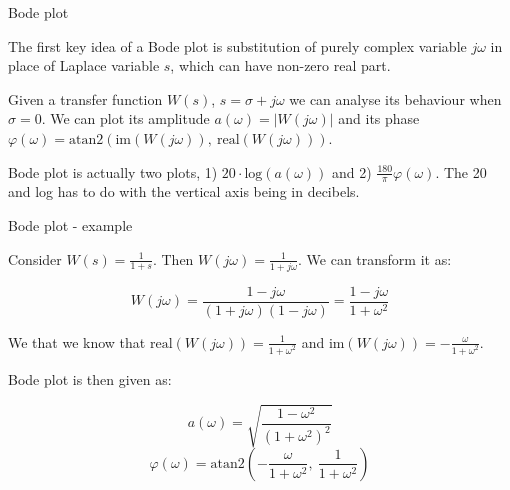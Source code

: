 \documentclass{beamer}
\begin{document}
\begin{frame}{Bode plot}
\begin{flushleft}

The first key idea of a Bode plot is substitution of purely complex variable $j \omega$ in place of Laplace variable $s$, which can have non-zero real part.

\bigskip

Given a transfer function $W(s)$, $s = \sigma + j \omega$ we can analyse its behaviour when $\sigma = 0$. We can plot its amplitude $a(\omega) = \left| W(j \omega) \right|$ and its phase $\varphi(\omega) = \text{atan2}( \text{im}(W(j \omega)), \ \text{real}(W(j \omega))  )$.

\bigskip
 
Bode plot is actually two plots, 1) $20 \cdot \text{log}(a(\omega))$ and 2) $\frac{180}{\pi} \varphi(\omega)$. The 20 and log has to do with the vertical axis being in decibels. 

\end{flushleft}
\end{frame}




\begin{frame}{Bode plot - example}
\begin{flushleft}

Consider $W(s) = \frac{1}{1 + s}$. Then $W(j \omega) = \frac{1}{1 + j \omega}$. We can transform it as:

\begin{equation}
    W(j \omega) = \frac{1 - j \omega}{(1 + j \omega)(1 - j \omega)} = 
    \frac{1 - j \omega}{1 + \omega^2}
\end{equation}

We that we know that $\text{real}(W(j \omega)) = \frac{1}{1 + \omega^2}$ and $\text{im}(W(j \omega)) = - \frac{\omega}{1 + \omega^2}$.

\bigskip
 
Bode plot is then given as:

\begin{equation}
   a(\omega) = \sqrt{\frac{1 - \omega^2}{(1 + \omega^2)^2}}
\end{equation}
\begin{equation}
   \varphi(\omega) = \text{atan2} \left(-\frac{\omega}{1 + \omega^2}, \ \frac{1}{1 + \omega^2} \right)
\end{equation}

\end{flushleft}
\end{frame}
\end{document}
